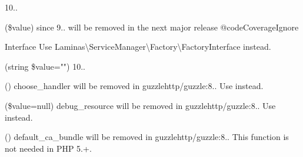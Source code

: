 \begin{DoxyRefList}
%
10..  
\item[\doxylink{report_8contract_8php_a77b973d137fb33212e018b042df6e3e7}{Global(e)} \doxylink{class_league_1_1_csv_1_1_escape_formula_ab65a5587dee29686b9f279a77defa76a}{Escape\+Formula\+::is\+Stringable} (\$value)]\label{deprecated__deprecated000088}%
%
since 9.. will be removed in the next major release @code\+Coverage\+Ignore 
\item[Interface \doxylink{interface_laminas_1_1_service_manager_1_1_factory_interface}{Factory\+Interface} ]\label{deprecated__deprecated000077}%
%
Use Laminas\textbackslash{}\+Service\+Manager\textbackslash{}\+Factory\textbackslash{}\+Factory\+Interface instead.  
\item[\doxylink{report_8contract_8php_a77b973d137fb33212e018b042df6e3e7}{Global(e)} \doxylink{class_glpi_1_1_dashboard_1_1_filter_a579990d80e3a75ae227c5f2810e990dd}{Filter\+::state} (string \$value="{}"{})]\label{deprecated__deprecated000003}%
%
10..  
\item[\doxylink{report_8contract_8php_a77b973d137fb33212e018b042df6e3e7}{Global(e)} \doxylink{namespace_guzzle_http_aa0c64d2c59c04841ad45dee17fda6656}{Guzzle\+Http\+::choose\+\_\+handler} ()]\label{deprecated__deprecated000031}%
%
choose\+\_\+handler will be removed in guzzlehttp/guzzle\+:8.. Use  instead.  
\item[\doxylink{report_8contract_8php_a77b973d137fb33212e018b042df6e3e7}{Global(e)} \doxylink{namespace_guzzle_http_a6f80794616c2fbd5400985f74672d713}{Guzzle\+Http\+::debug\+\_\+resource} (\$value=null)]\label{deprecated__deprecated000030}%
%
debug\+\_\+resource will be removed in guzzlehttp/guzzle\+:8.. Use  instead.  
\item[\doxylink{report_8contract_8php_a77b973d137fb33212e018b042df6e3e7}{Global(e)} \doxylink{namespace_guzzle_http_aeaed8c70455d561e9de7ca3029dc79f9}{Guzzle\+Http\+::default\+\_\+ca\+\_\+bundle} ()]\label{deprecated__deprecated000033}%
%
default\+\_\+ca\+\_\+bundle will be removed in guzzlehttp/guzzle\+:8.. This function is not needed in PHP 5.+.  

\end{DoxyRefList}
